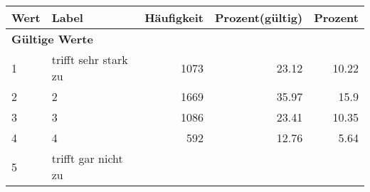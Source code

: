      \begin{longtable}{lXrrr}
     \toprule
     \textbf{Wert} & \textbf{Label} & \textbf{Häufigkeit} & \textbf{Prozent(gültig)} & \textbf{Prozent} \\
     \endhead
     \midrule
     \multicolumn{5}{l}{\textbf{Gültige Werte}}\\

     1 &
     \multicolumn{1}{X}{ trifft sehr stark zu   } &


       \num{1073} &
       \num[round-mode=places,round-precision=2]{23.12} &
         \num[round-mode=places,round-precision=2]{10.22} \\

     2 &
     \multicolumn{1}{X}{ 2   } &


       \num{1669} &
       \num[round-mode=places,round-precision=2]{35.97} &
         \num[round-mode=places,round-precision=2]{15.9} \\

     3 &
     \multicolumn{1}{X}{ 3   } &


       \num{1086} &
       \num[round-mode=places,round-precision=2]{23.41} &
         \num[round-mode=places,round-precision=2]{10.35} \\

     4 &
     \multicolumn{1}{X}{ 4   } &


       \num{592} &
       \num[round-mode=places,round-precision=2]{12.76} &
         \num[round-mode=places,round-precision=2]{5.64} \\

     5 &
     \multicolumn{1}{X}{ trifft gar nicht zu   } &



\end{longtable}
